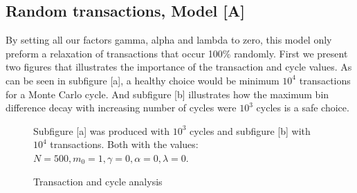 \documentclass[a4paper,11pt]{article}
\begin{document}
	\subsection{Random transactions, Model [A]}
By setting all our factors gamma, alpha and lambda to zero, this model only preform a relaxation of transactions that occur 100\% randomly. First we present two figures that illustrates the importance of the transaction and cycle values. As can be seen in subfigure [a], a healthy choice would be minimum $10^4$ transactions for a Monte Carlo cycle. And subfigure [b] illustrates how the maximum bin difference decay with increasing number of cycles were $10^3$ cycles is a safe choice.
\begin{figure}[H]
  \hfill
  \caption{Transaction and cycle analysis}
{\small Subfigure [a] was produced with $10^3$ cycles and subfigure [b] with $10^4$ transactions. Both with the values: $N = 500, m_0 = 1, \gamma = 0, \alpha = 0, \lambda = 0$. }
\end{figure}
\end{document}
